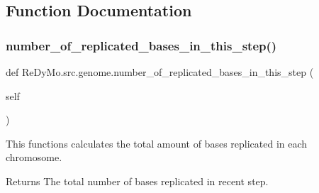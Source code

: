 \subsection{Function Documentation}
\mbox{\label{namespaceReDyMo_1_1src_1_1genome_add11ea37fbc0e256164c4107d758b43b}} 
\subsubsection{\texorpdfstring{number\+\_\+of\+\_\+replicated\+\_\+bases\+\_\+in\+\_\+this\+\_\+step()}{number\_of\_replicated\_bases\_in\_this\_step()}}
{\footnotesize\ttfamily def Re\+Dy\+Mo.\+src.\+genome.\+number\+\_\+of\+\_\+replicated\+\_\+bases\+\_\+in\+\_\+this\+\_\+step (\begin{DoxyParamCaption}\item[{}]{self }\end{DoxyParamCaption})}



This functions calculates the total amount of bases replicated in each chromosome. 

\begin{DoxyReturn}{Returns}
The total number of bases replicated in recent step. 
\end{DoxyReturn}
